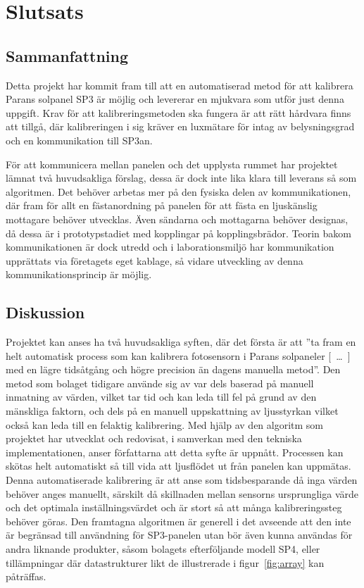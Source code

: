 \section{Slutsats} %
\label{sec:slutsats}
    \subsection{Sammanfattning} %
    \label{sub:sammanfattning}
        Detta projekt har kommit fram till att en automatiserad metod för att kalibrera Parans solpanel SP3 är möjlig och levererar en mjukvara som utför just denna uppgift. Krav för att kalibreringsmetoden ska fungera är att rätt hårdvara finns att tillgå, där kalibreringen i sig kräver en luxmätare för intag av belysningsgrad och en kommunikation till SP3an.\bigskip 

        För att kommunicera mellan panelen och det upplysta rummet har projektet lämnat två huvudsakliga förslag, dessa är dock inte lika klara till leverans så som algoritmen. Det behöver arbetas mer på den fysiska delen av kommunikationen, där fram för allt en fästanordning på panelen för att fästa en ljuskänslig mottagare behöver utvecklas. Även sändarna och mottagarna behöver designas, då dessa är i prototypstadiet med kopplingar på kopplingsbrädor. Teorin bakom kommunikationen är dock utredd och i laborationsmiljö har kommunikation upprättats via företagets eget kablage, så vidare utveckling av denna kommunikationsprincip är möjlig.

    \subsection{Diskussion} %
    \label{sub:diskussion}
        Projektet kan anses ha två huvudsakliga syften, där det första är att ''ta fram en helt automatisk process som kan kalibrera fotosensorn i Parans solpaneler [~\dots~] med en lägre tidsåtgång och högre precision än dagens manuella metod''. 
        Den metod som bolaget tidigare använde sig av var dels baserad på manuell inmatning av värden, vilket tar tid och kan leda till fel på grund av den mänskliga faktorn, och dels på en manuell uppskattning av ljusstyrkan vilket också kan leda till en felaktig kalibrering. 
        Med hjälp av den algoritm som projektet har utvecklat och redovisat, i samverkan med den tekniska implementationen, anser författarna att detta syfte är uppnått. Processen kan skötas helt automatiskt så till vida att ljusflödet ut från panelen kan uppmätas. 
        Denna automatiserade kalibrering är att anse som tidsbesparande då inga värden behöver anges manuellt, särskilt då skillnaden mellan sensorns ursprungliga värde och det optimala inställningsvärdet och är stort så att många kalibreringssteg behöver göras. Den framtagna algoritmen är generell i det avseende att den inte är begränsad till användning för SP3-panelen utan bör även kunna användas för andra liknande produkter, såsom bolagets efterföljande modell SP4, eller tillämpningar där datastrukturer likt de illustrerade i figur~\ref{fig:array} kan påträffas.\bigskip

